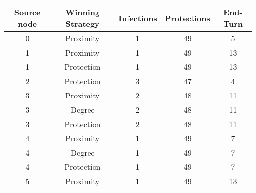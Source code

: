 \documentclass[results.tex]{subfiles}
\begin{document}
    \begin{center}
        \begin{tabular}{| c || c | c | c | c |}
            \hline
            {\bfseries Source node} & {\bfseries Winning Strategy} & {\bfseries Infections} & {\bfseries Protections}
            & {\bfseries End-Turn}
            \\  %
            \hline\hline
            0                       & Proximity                    & 1                      & 49                      & 5                    \\
            \hline
            1                       & Proximity                    & 1                      & 49                      & 13                   \\
            \hline
            1                       & Protection                   & 1                      & 49                      & 13                   \\
            \hline
            2                       & Protection                   & 3                      & 47                      & 4                    \\
            \hline
            3                       & Proximity                    & 2                      & 48                      & 11                   \\
            \hline
            3                       & Degree                       & 2                      & 48                      & 11                   \\
            \hline
            3                       & Protection                   & 2                      & 48                      & 11                   \\
            \hline
            4                       & Proximity                    & 1                      & 49                      & 7                    \\
            \hline
            4                       & Degree                       & 1                      & 49                      & 7                    \\
            \hline
            4                       & Protection                   & 1                      & 49                      & 7                    \\
            \hline
            5                       & Proximity                    & 1                      & 49                      & 13                   \\

\end{tabular}
\end{center}
\end{document}
